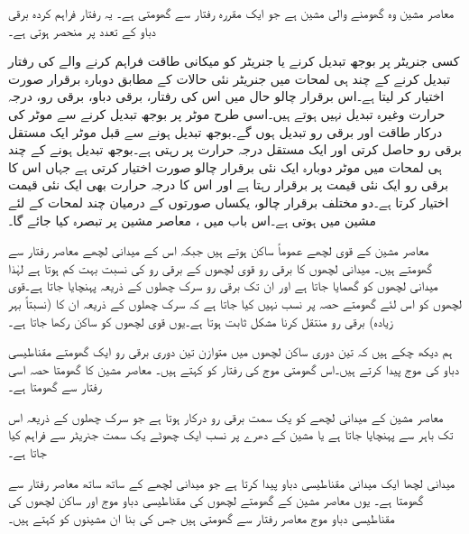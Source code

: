 معاصر مشین وہ گھومنے والی مشین ہے جو ایک مقررہ رفتار سے گھومتی ہے۔ یہ رفتار فراہم کردہ برقی دباو کے تعدد پر منحصر ہوتی ہے۔

کسی جنریٹر پر بوجھ تبدیل کرنے یا جنریٹر کو میکانی طاقت فراہم کرنے والے کی رفتار تبدیل کرنے کے چند ہی لمحات  میں جنریٹر نئی حالات کے  مطابق  دوبارہ برقرار  صورت اختیار کر لیتا ہے۔اس برقرار چالو حال میں اس کی رفتار، برقی دباو، برقی رو، درجہ حرارت وغیرہ  تبدیل نہیں ہوتے ہیں۔اسی طرح  موٹر پر بوجھ تبدیل کرنے سے موٹر کی درکار طاقت اور برقی رو تبدیل ہوں گے۔بوجھ تبدیل ہونے سے قبل موٹر  ایک مستقل برقی رو حاصل کرتی  اور ایک مستقل درجہ حرارت  پر رہتی ہے۔بوجھ تبدیل ہونے کے چند ہی لمحات میں موٹر دوبارہ ایک نئی برقرار چالو صورت اختیار کرتی ہے جہاں اس کا برقی رو ایک نئی قیمت پر برقرار رہتا ہے اور اس کا درجہ حرارت بھی ایک نئی قیمت اختیار کرتا ہے۔دو مختلف برقرار چالو، یکساں صورتوں کے درمیان چند لمحات کے لئے مشین  میں ہوتی ہے۔اس باب میں ،  معاصر مشین پر تبصرہ کیا جائے گا۔ 

معاصر مشین کے قوی لچھے عموماً ساکن ہوتے ہیں  جبکہ اس کے میدانی لچھے معاصر رفتار سے گھومتے ہیں۔ میدانی لچھوں کا برقی رو قوی لچھوں کے برقی رو کی نسبت  بہت کم ہوتا ہے لہٰذا میدانی لچھوں کو گھمایا جاتا ہے اور ان تک برقی رو سرک چھلوں کے ذریعہ پہنچایا جاتا ہے۔قوی لچھوں کو اس لئے گھومتے حصہ پر نسب نہیں کیا جاتا ہے کہ سرک چھلوں کے ذریعہ ان کا (نسبتاً بہر زیادہ) برقی رو منتقل کرنا مشکل ثابت ہوتا ہے۔یوں قوی لچھوں کو ساکن رکھا جاتا ہے۔

 ہم  دیکھ چکے ہیں کہ تین دوری ساکن لچھوں میں  متوازن تین دوری برقی رو  ایک گھومتے مقناطیسی دباو کی موج پیدا کرتے ہیں۔اس گھومتی موج کی رفتار کو   کہتے ہیں۔ معاصر مشین کا گھومتا حصہ اسی رفتار سے گھومتا ہے۔ 

معاصر مشین کے میدانی لچھے کو یک سمت  برقی رو درکار ہوتا ہے جو  سرک چھلوں کے ذریعہ اس تک باہر سے پہنچایا جاتا ہے یا  مشین کے دھرے پر  نسب ایک چھوٹے یک سمت  جنریٹر سے  فراہم کیا جاتا ہے۔

میدانی لچھا ایک میدانی مقناطیسی دباو پیدا کرتا ہے جو میدانی لچھے کے ساتھ ساتھ معاصر رفتار سے گھومتا ہے۔ یوں معاصر مشین کے گھومتے لچھوں کی مقناطیسی دباو موج  اور ساکن لچھوں کی مقناطیسی دباو موج معاصر رفتار سے  گھومتی ہیں جس کی بنا  ان مشینوں کو   کہتے ہیں۔

